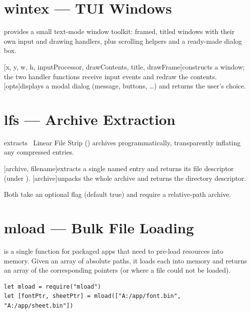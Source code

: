 \section{wintex --- TUI Windows}

 provides a small text-mode window toolkit: framed, titled windows with their own input and drawing handlers, plus scrolling helpers and a ready-made dialog box.

\begin{outline}
\1[x, y, w, h, inputProcessor, drawContents, title, drawFrame]{constructs a window; the two handler functions receive input events and redraw the contents.}
\1[opts]{displays a modal dialog (message, buttons, \dots) and returns the user's choice.}
\1
\end{outline}

\section{lfs --- Archive Extraction}

 extracts \thedos\ Linear File Strip () archives programmatically, transparently inflating any compressed entries.

\begin{outline}
\1[archive, filename]{extracts a single named entry and returns its file descriptor (under ).}
\1[archive]{unpacks the whole archive and returns the directory descriptor.}
\end{outline}
Both take an optional  flag (default true) and require a relative-path archive.

\section{mload --- Bulk File Loading}

 is a single function for packaged apps that need to pre-load resources into memory. Given an array of absolute paths, it loads each into memory and returns an array of the corresponding pointers (or  where a file could not be loaded).

\begin{lstlisting}
let mload = require("mload")
let [fontPtr, sheetPtr] = mload(["A:/app/font.bin", "A:/app/sheet.bin"])
\end{lstlisting}


